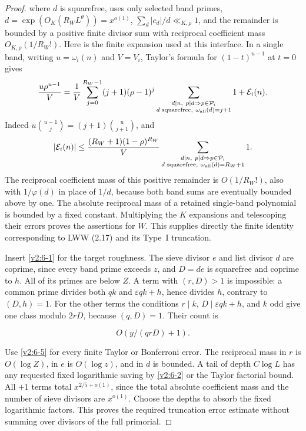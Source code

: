 \documentclass[11pt]{article}
\theoremstyle{definition}
\theoremstyle{remark}
\numberwithin{equation}{section}
\begin{document}
\begin{proof}
where $d$ is squarefree, uses only selected band primes, $d=\exp(O_K(R_WL^\theta))=x^{o(1)}$, $\sum_d|c_d|/d\ll_{K,\rho}1$, and the remainder is bounded by a positive finite divisor sum with reciprocal coefficient mass $O_{K,\rho}(1/R_W!)$. Here is the finite expansion used at this interface. In a single
band, writing $u=\omega_i(n)$ and $V=V_i$, Taylor's formula for
$(1-t)^{u-1}$ at $t=0$ gives
\begin{equation}\label{eq:finite-taylor}
 \frac{u\rho^{u-1}}V
 =\frac1V\sum_{j=0}^{R_W-1}(j+1)(\rho-1)^j
   \sum_{\substack{d\mid n,\ p\mid d\Rightarrow p\in\mathcal P_i\\
                    d\text{ squarefree},\ \omega_{\rm all}(d)=j+1}}1
   +\mathcal E_i(n).
\end{equation}
Indeed $u\binom{u-1}{j}=(j+1)\binom{u}{j+1}$, and
\begin{equation}
 |\mathcal E_i(n)|\le
 \frac{(R_W+1)(1-\rho)^{R_W}}V
 \sum_{\substack{d\mid n,\ p\mid d\Rightarrow p\in\mathcal P_i\\
                  d\text{ squarefree},\ \omega_{\rm all}(d)=R_W+1}}1.
\end{equation}
The reciprocal coefficient mass of this positive remainder is
$O(1/R_W!)$, also with $1/\varphi(d)$ in place of $1/d$,
because both band sums are eventually bounded above by one.
The absolute reciprocal mass of a retained single-band polynomial
is bounded by a fixed constant. Multiplying the $K$ expansions
and telescoping their errors proves the assertions for $W$.
This supplies directly the finite identity corresponding to
LWW (2.17) and its Type~I truncation.

Insert \eqref{v2:6-1} for the target roughness. The sieve divisor $e$ and list divisor $d$ are coprime, since every band prime exceeds $z$, and $D=de$ is squarefree and coprime to $h$. All of its primes are below $Z$. A term with $(r,D)>1$ is impossible: a common prime divides both $qk$ and $\varepsilon qk+h$, hence divides $h$, contrary to $(D,h)=1$. For the other terms the conditions $r\mid k$, $D\mid\varepsilon qk+h$, and $k$ odd give one class modulo $2rD$, because $(q,D)=1$. Their count is


\begin{equation}\label{v2:6-5}
O(y/(qrD)+1).
\end{equation}


Use \eqref{v2:6-5} for every finite Taylor or Bonferroni error. The reciprocal mass in $r$ is $O(\log Z)$, in $e$ is $O(\log z)$, and in $d$ is bounded. A tail of depth $C\log L$ has any requested fixed logarithmic saving by \eqref{v2:6-2} or the Taylor factorial bound. All $+1$ terms total $x^{2/5+o(1)}$, since the total absolute coefficient mass and the number of sieve divisors are $x^{o(1)}$. Choose the depths to absorb the fixed logarithmic factors. This proves the required truncation error estimate without summing over divisors of the full primorial.


\end{proof}
\end{document}
